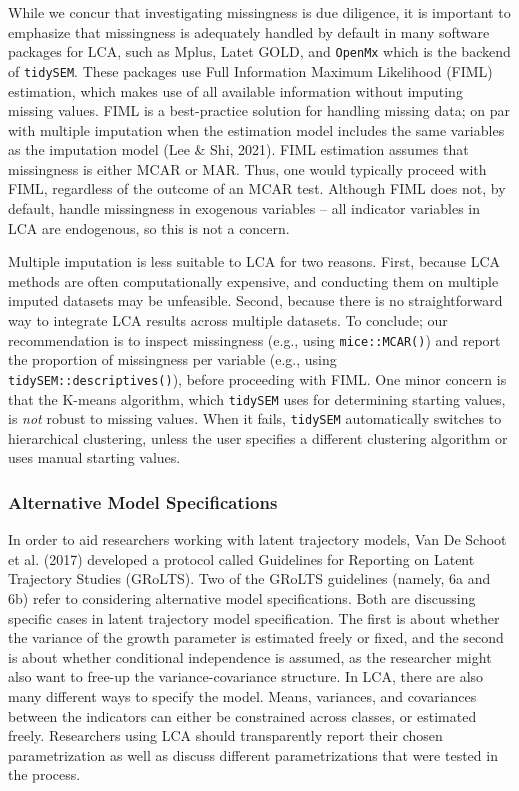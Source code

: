 \documentclass[
  ,man,floatsintext]{apa6}
\begin{document}
While we concur that investigating missingness is due diligence, it is
important to emphasize that missingness is adequately handled by default
in many software packages for LCA, such as Mplus, Latet GOLD, and \texttt{OpenMx} which is
the backend of \texttt{tidySEM}. These packages use Full Information Maximum
Likelihood (FIML) estimation, which makes use of all available
information without imputing missing values. FIML is a best-practice
solution for handling missing data; on par with multiple imputation when the estimation model includes the same variables as the imputation model
(Lee \& Shi, 2021). FIML estimation assumes that missingness is
either MCAR or MAR. Thus, one would typically proceed with FIML,
regardless of the outcome of an MCAR test. Although FIML does not, by
default, handle missingness in exogenous variables -- all indicator
variables in LCA are endogenous, so this is not a concern.

Multiple imputation is less suitable to LCA for two reasons. First,
because LCA methods are often computationally expensive, and conducting
them on multiple imputed datasets may be unfeasible. Second, because
there is no straightforward way to integrate LCA results across multiple
datasets. To conclude; our recommendation is to inspect missingness
(e.g., using \texttt{mice::MCAR()}) and report the proportion of missingness
per variable (e.g., using \texttt{tidySEM::descriptives()}), before proceeding
with FIML. One minor concern is that the K-means algorithm, which
\texttt{tidySEM} uses for determining starting values, is \emph{not} robust to
missing values. When it fails, \texttt{tidySEM} automatically switches to
hierarchical clustering, unless the user specifies a different
clustering algorithm or uses manual starting values.

\hypertarget{alternative-model-specifications}{%
\subsubsection{Alternative Model Specifications}\label{alternative-model-specifications}}

In order to aid researchers working with latent trajectory models,
Van De Schoot et al. (2017) developed a protocol called
Guidelines for Reporting on Latent Trajectory Studies (GRoLTS). Two of
the GRoLTS guidelines (namely, 6a and 6b) refer to considering
alternative model specifications. Both are discussing specific cases in
latent trajectory model specification. The first is about whether the
variance of the growth parameter is estimated freely or fixed, and the
second is about whether conditional independence is assumed, as the
researcher might also want to free-up the variance-covariance structure.
In LCA, there are also many different ways to specify the model. Means,
variances, and covariances between the indicators can either be
constrained across classes, or estimated freely. Researchers using LCA
should transparently report their chosen parametrization as well as
discuss different parametrizations that were tested in the process.
\end{document}
